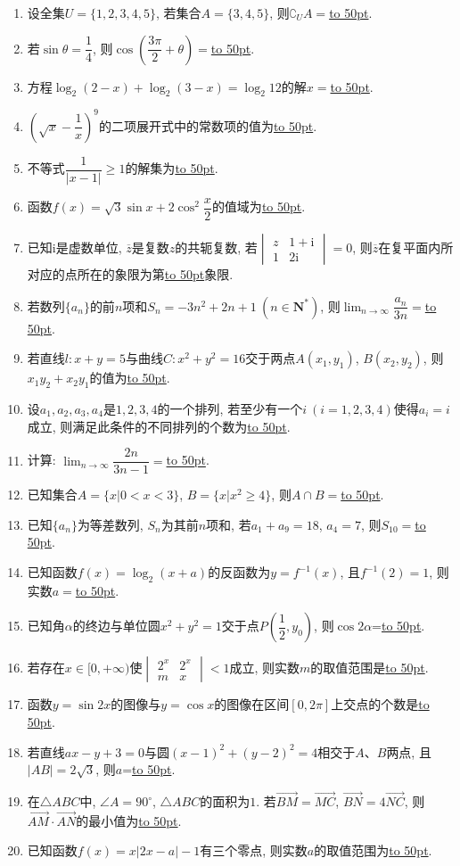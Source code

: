 \documentclass[10pt,a4paper]{article}
\newcommand{\blank}[1]{\underline{\hbox to #1pt{}}}
\begin{document}
\begin{enumerate}[1.]

\item 设全集$U=\{ 1,2,3,4,5\}$, 若集合$A=\{3,4,5\}$, 则$\complement_U A=$\blank{50}. 
\item 若$\sin\theta=\dfrac14$, 则$\cos(\dfrac{3 \pi}2+\theta)=$\blank{50}.
\item 方程$\log_2(2-x)+\log_2(3-x)=\log_2 12$的解$x=$\blank{50}.
\item $(\sqrt x-\dfrac1x)^9$的二项展开式中的常数项的值为\blank{50}.
\item 不等式$\dfrac1{|x-1|}\ge 1 $的解集为\blank{50}.
\item 函数$f(x)=\sqrt 3\sin x+2\cos^2\dfrac x2$的值域为\blank{50}.
\item 已知$\mathrm{i}$是虚数单位, $\overline z$是复数$z$的共轭复数, 若$\begin{vmatrix} z & 1+\mathrm{i}  \\ 1 & 2\mathrm{i} \end{vmatrix}=0$, 则$\overline z$在复平面内所对应的点所在的象限为第\blank{50}象限. 
\item 若数列$\{a_n\}$的前$n$项和$S_n=-3n^2+2n+1 \ (n\in \mathbf{N}^*)$, 则$\displaystyle\lim_{n\to\infty}\dfrac{a_n}{3n}=$\blank{50}.
\item 若直线$l:x+y=5$与曲线$C:x^2+y^2=16$交于两点$A(x_1,y_1)$, $B(x_2,y_2)$, 则$x_1y_2+x_2y_1$的值为\blank{50}.
\item 设$a_1,a_2,a_3,a_4$是$1,2,3,4$的一个排列, 若至少有一个$i\ (i=1,2,3,4)$使得$a_i=i$成立, 则满足此条件的不同排列的个数为\blank{50}.


\item 计算: $\displaystyle\lim_{n\to\infty}\dfrac{2n}{3n-1}=$\blank{50}.
\item 已知集合$A=\{x|0<x<3\}$, $B=\{x|x^2\ge 4\}$, 则$A\cap B=$\blank{50}.  
\item 已知$\{a_n\}$为等差数列, $S_n$为其前$n$项和, 若$a_1+a_9=18$, $a_4=7 $, 则$S_{10}=$\blank{50}.
\item 已知函数$f(x)=\log_2(x+a)$的反函数为$y=f^{-1}(x)$, 且$f^{-1}(2)=1$, 则实数$a=$\blank{50}.
\item 已知角$\alpha$的终边与单位圆$x^2+y^2=1$交于点$P(\dfrac12,y_0)$, 则$\cos 2 \alpha$=\blank{50}.
\item 若存在$x\in [0,+\infty)$使$\begin{vmatrix}2^x & 2^x \\ m & x \end{vmatrix}<1$成立, 则实数$m$的取值范围是\blank{50}.
\item 函数$y=\sin 2x$的图像与$y=\cos x$的图像在区间$[0,2\pi]$上交点的个数是\blank{50}.
\item 若直线$ax-y+3=0$与圆$(x-1)^2+(y-2)^2=4$相交于$A$、$B$两点, 且$|AB|=2 \sqrt3$, 则$a$=\blank{50}.
\item 在$\triangle ABC$中, $\angle A=90^\circ $, $\triangle ABC$的面积为$1$. 若$\overrightarrow{BM}=\overrightarrow{MC}$, $\overrightarrow{BN}=4 \overrightarrow{NC}$, 则$\overrightarrow{AM}\cdot \overrightarrow{AN}$的最小值为\blank{50}.  
\item 已知函数$f(x)=x|2x-a|-1$有三个零点, 则实数$a$的取值范围为\blank{50}.


\end{enumerate}
\end{document}
